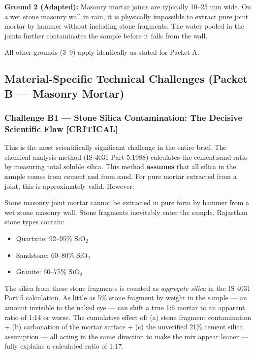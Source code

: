 \documentclass[12pt, a4paper]{article}
\begin{document}
\textbf{Ground 2 (Adapted):} Masonry mortar joints are typically 10--25 mm wide. On a wet stone masonry wall in rain, it is physically impossible to extract pure joint mortar by hammer without including stone fragments. The water pooled in the joints further contaminates the sample before it falls from the wall.

All other grounds (3--9) apply identically as stated for Packet A.

\subsection{Material-Specific Technical Challenges (Packet B --- Masonry Mortar)}

\subsubsection{Challenge B1 --- Stone Silica Contamination: The Decisive Scientific Flaw \textbf{[CRITICAL]}}

\begin{criticalbox}
This is the most scientifically significant challenge in the entire brief. The chemical analysis method (IS 4031 Part 5:1988) calculates the cement:sand ratio by measuring total soluble silica. This method \textbf{assumes} that all silica in the sample comes from cement and from sand. For pure mortar extracted from a joint, this is approximately valid. However:

Stone masonry joint mortar cannot be extracted in pure form by hammer from a wet stone masonry wall. Stone fragments inevitably enter the sample. Rajasthan stone types contain:
\begin{itemize}
  \item Quartzite: 92--95\% SiO$_2$
  \item Sandstone: 60--80\% SiO$_2$
  \item Granite: 60--75\% SiO$_2$
\end{itemize}

The silica from these stone fragments is counted as \textit{aggregate silica} in the IS 4031 Part 5 calculation. As little as 5\% stone fragment by weight in the sample --- an amount invisible to the naked eye --- can shift a true 1:6 mortar to an apparent ratio of 1:14 or worse. The cumulative effect of: (a) stone fragment contamination + (b) carbonation of the mortar surface + (c) the unverified 21\% cement silica assumption --- all acting in the same direction to make the mix appear leaner --- fully explains a calculated ratio of 1:17.
\end{criticalbox}
\end{document}
